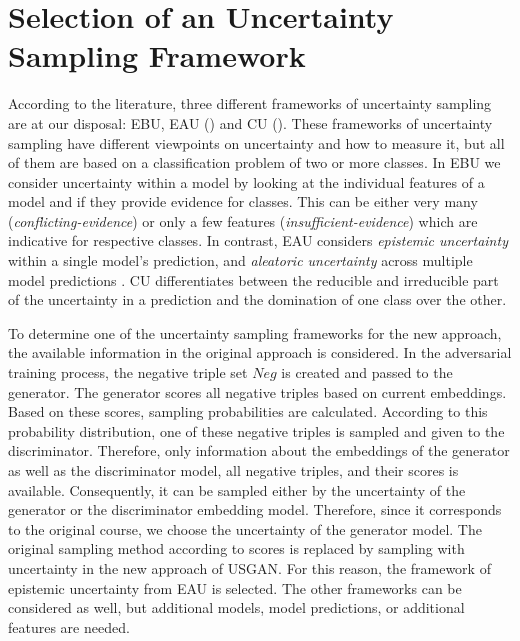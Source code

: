 \section{Selection of an Uncertainty Sampling Framework} 
\label{sec:selection_of_an_uncertainty_sampling_type}
%
According to the literature, three different frameworks of uncertainty sampling are at our disposal:
\ac{EBU}, \ac{EAU} () and \ac{CU} ().
These frameworks of uncertainty sampling have different viewpoints on uncertainty and how to measure it, but all of them are based on a classification problem of two or more classes.
In \ac{EBU} we consider uncertainty within a model by looking at the individual features of a model and if they provide evidence for classes.
This can be either very many (\textit{conflicting-evidence}) or only a few features (\textit{insufficient-evidence}) which are indicative for respective classes.
In contrast, \ac{EAU} considers \textit{epistemic uncertainty} within a single model’s prediction, and \textit{aleatoric uncertainty} across multiple model predictions \cite{human-in-the-loop}.
\Ac{CU} differentiates between the reducible and irreducible part of the uncertainty in a prediction and the domination of one class over the other.

To determine one of the uncertainty sampling frameworks for the new approach, the available information in the original \kbgan approach is considered.
In the adversarial training process, the negative triple set $Neg$ is created and passed to the generator.
The generator scores all negative triples based on current embeddings.
Based on these scores, sampling probabilities are calculated.
According to this probability distribution, one of these negative triples is sampled and given to the discriminator.
Therefore, only information about the embeddings of the generator as well as the discriminator model, all negative triples, and their scores is available.
Consequently, it can be sampled either by the uncertainty of the generator or the discriminator embedding model.
Therefore, since it corresponds to the original course, we choose the uncertainty of the generator model.
The original sampling method according to scores is replaced by sampling with uncertainty in the new approach of \textsc{USGAN}.
For this reason, the framework of epistemic uncertainty from \ac{EAU} is selected.
The other frameworks can be considered as well, but additional models, model predictions, or additional features are needed.
%